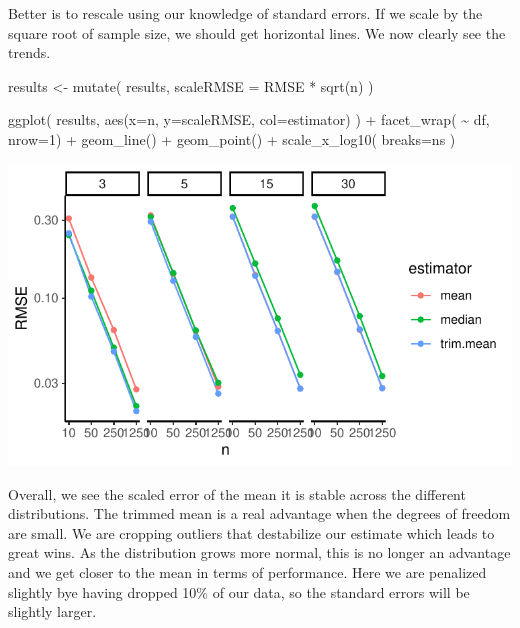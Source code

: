 \documentclass[
]{book}
\newenvironment{Shaded}{\begin{snugshade}}{\end{snugshade}}
\newcommand{\AttributeTok}[1]{\textcolor[rgb]{0.77,0.63,0.00}{#1}}
\newcommand{\DecValTok}[1]{\textcolor[rgb]{0.00,0.00,0.81}{#1}}
\newcommand{\FunctionTok}[1]{\textcolor[rgb]{0.00,0.00,0.00}{#1}}
\newcommand{\NormalTok}[1]{#1}
\newcommand{\OtherTok}[1]{\textcolor[rgb]{0.56,0.35,0.01}{#1}}
\newcommand{\SpecialCharTok}[1]{\textcolor[rgb]{0.00,0.00,0.00}{#1}}
\begin{document}
Better is to rescale using our knowledge of standard errors. If we scale by
the square root of sample size, we should get horizontal lines. We now
clearly see the trends.

\begin{Shaded}
\begin{Highlighting}[]
\NormalTok{results }\OtherTok{\textless{}{-}} \FunctionTok{mutate}\NormalTok{( results, }\AttributeTok{scaleRMSE =}\NormalTok{ RMSE }\SpecialCharTok{*} \FunctionTok{sqrt}\NormalTok{(n) )}
\end{Highlighting}
\end{Shaded}

\begin{Shaded}
\begin{Highlighting}[]
\FunctionTok{ggplot}\NormalTok{( results, }\FunctionTok{aes}\NormalTok{(}\AttributeTok{x=}\NormalTok{n, }\AttributeTok{y=}\NormalTok{scaleRMSE, }\AttributeTok{col=}\NormalTok{estimator) ) }\SpecialCharTok{+}
    \FunctionTok{facet\_wrap}\NormalTok{( }\SpecialCharTok{\textasciitilde{}}\NormalTok{ df, }\AttributeTok{nrow=}\DecValTok{1}\NormalTok{) }\SpecialCharTok{+}
    \FunctionTok{geom\_line}\NormalTok{() }\SpecialCharTok{+} \FunctionTok{geom\_point}\NormalTok{() }\SpecialCharTok{+}
    \FunctionTok{scale\_x\_log10}\NormalTok{( }\AttributeTok{breaks=}\NormalTok{ns )}
\end{Highlighting}
\end{Shaded}

\begin{center}\includegraphics[width=0.75\linewidth]{Designing-Simulations-in-R_files/figure-latex/unnamed-chunk-183-1} \end{center}

Overall, we see the scaled error of the mean it is stable across the
different distributions. The trimmed mean is a real advantage when the
degrees of freedom are small. We are cropping outliers that destabilize our
estimate which leads to great wins. As the distribution grows more normal,
this is no longer an advantage and we get closer to the mean in terms of
performance. Here we are penalized slightly bye having dropped 10\% of our
data, so the standard errors will be slightly larger.
\end{document}

